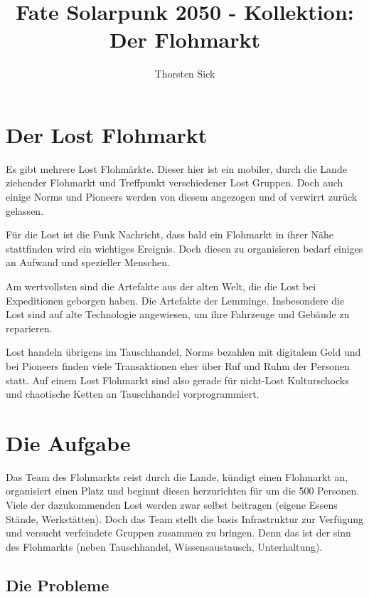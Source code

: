 \documentclass{book}
\title{Fate Solarpunk 2050 - Kollektion: Der Flohmarkt}
\author{Thorsten Sick}
\begin{document}
%
%
\mbox{}
\thispagestyle{empty}
\BgThispage




\chapter{Der Lost Flohmarkt}

Es gibt mehrere Lost Flohmärkte. Dieser hier ist ein mobiler, durch die Lande ziehender Flohmarkt und Treffpunkt verschiedener Lost Gruppen. Doch auch einige Norms und Pioneers werden von diesem angezogen und of verwirrt zurück gelassen.

Für die Lost ist die Funk Nachricht, dass bald ein Flohmarkt in ihrer Nähe stattfinden wird ein wichtiges Ereignis. Doch diesen zu organisieren bedarf einiges an Aufwand und spezieller Menschen.

Am wertvollsten sind die Artefakte aus der alten Welt, die die Lost bei Expeditionen geborgen haben. Die Artefakte der Lemminge. Insbesondere die Lost sind auf alte Technologie angewiesen, um ihre Fahrzeuge und Gebäude zu reparieren.

Lost handeln übrigens im Tauschhandel, Norms bezahlen mit digitalem Geld und bei Pioneers finden viele Transaktionen eher über Ruf und Ruhm der Personen statt. Auf einem Lost Flohmarkt sind also gerade für nicht-Lost Kulturschocks und chaotische Ketten an Tauschhandel vorprogrammiert.

\chapter{Die Aufgabe}

Das Team des Flohmarkts reist durch die Lande, kündigt einen Flohmarkt an, organisiert einen Platz und beginnt diesen herzurichten für um die 500 Personen. Viele der dazukommenden Lost werden zwar selbst beitragen (eigene Essens Stände, Werkstätten).
Doch das Team stellt die basis Infrastruktur zur Verfügung und versucht verfeindete Gruppen zusammen zu bringen. Denn das ist der sinn des Flohmarkts (neben Tauschhandel, Wissensaustausch, Unterhaltung).

\section{Die Probleme}
\end{document}
